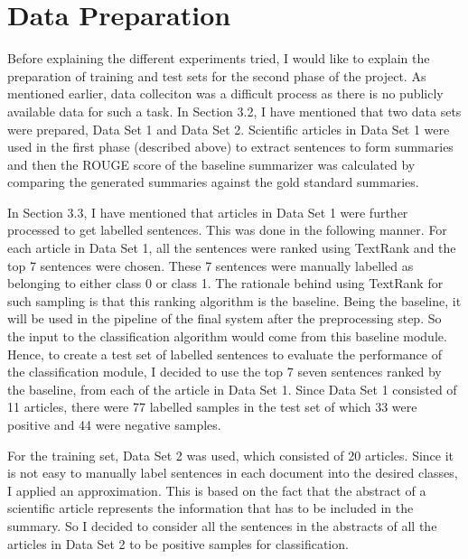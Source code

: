 \section{Data Preparation}
Before explaining the different experiments tried, I would like to explain the preparation of training and test sets for the second phase of the project.
As mentioned earlier, data colleciton was a difficult process as there is no publicly available data for such a task.
In Section 3.2, I have mentioned that two data sets were prepared, Data Set 1 and Data Set 2.
Scientific articles in Data Set 1 were used in the first phase (described above) to extract sentences to form summaries and then the ROUGE score of the baseline summarizer was calculated by comparing the generated summaries against the gold standard summaries.

In Section 3.3, I have mentioned that articles in Data Set 1 were further processed to get labelled sentences.
This was done in the following manner.
For each article in Data Set 1, all the sentences were ranked using TextRank and the top 7 sentences were chosen.
These 7 sentences were manually labelled as belonging to either class 0 or class 1.
The rationale behind using TextRank for such sampling is that this ranking algorithm is the baseline.
Being the baseline, it will be used in the pipeline of the final system after the preprocessing step.
So the input to the classification algorithm would come from this baseline module.
Hence, to create a test set of labelled sentences to evaluate the performance of the classification module, I decided to use the top 7 seven sentences ranked by the baseline, from each of the article in Data Set 1.
Since Data Set 1 consisted of 11 articles, there were 77 labelled samples in the test set of which 33 were positive and 44 were negative samples.

For the training set, Data Set 2 was used, which consisted of 20 articles.
Since it is not easy to manually label sentences in each document into the desired classes, I applied an approximation.
This is based on the fact that the abstract of a scientific article represents the information that has to be included in the summary.
So I decided to consider all the sentences in the abstracts of all the articles in Data Set 2 to be positive samples for classification.

